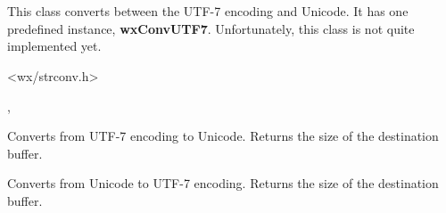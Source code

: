 %
%


\section{}\label{wxmbconvutf7}

This class converts between the UTF-7 encoding and Unicode.
It has one predefined instance, {\bf wxConvUTF7}.
Unfortunately, this class is not quite implemented yet.




<wx/strconv.h>


, 



\label{wxmbconvutf7mb2wc}


Converts from UTF-7 encoding to Unicode. Returns the size of the destination buffer.

\label{wxmbconvutf7wc2mb}


Converts from Unicode to UTF-7 encoding. Returns the size of the destination buffer.
